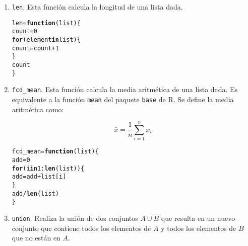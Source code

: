 \documentclass[12pt]{report}\usepackage[]{graphicx}\usepackage[dvipsnames]{xcolor}
\makeatletter
\newcommand{\hlnum}[1]{\textcolor[rgb]{0.686,0.059,0.569}{#1}}%
\newcommand{\hlopt}[1]{\textcolor[rgb]{0,0,0}{#1}}%
\newcommand{\hlstd}[1]{\textcolor[rgb]{0.345,0.345,0.345}{#1}}%
\newcommand{\hlkwa}[1]{\textcolor[rgb]{0.161,0.373,0.58}{\textbf{#1}}}%
\newcommand{\hlkwb}[1]{\textcolor[rgb]{0.69,0.353,0.396}{#1}}%
\newcommand{\hlkwc}[1]{\textcolor[rgb]{0.333,0.667,0.333}{#1}}%
\newcommand{\hlkwd}[1]{\textcolor[rgb]{0.737,0.353,0.396}{\textbf{#1}}}%
\newenvironment{kframe}{%
 \def\at@end@of@kframe{}%
 \ifinner\ifhmode%
  \def\at@end@of@kframe{\end{minipage}}%
  \begin{minipage}{\columnwidth}%
 \fi\fi%
 \def\FrameCommand##1{\hskip\@totalleftmargin \hskip-\fboxsep
 \colorbox{shadecolor}{##1}\hskip-\fboxsep
     \hskip-\linewidth \hskip-\@totalleftmargin \hskip\columnwidth}%
 \MakeFramed {\advance\hsize-\width
   \@totalleftmargin\z@ \linewidth\hsize
   \@setminipage}}%
 {\par\unskip\endMakeFramed%
 \at@end@of@kframe}
\newenvironment{knitrout}{}{} %
\makeatother
\begin{document}
		 	\begin{enumerate}[label = \textbf{\arabic*.}]
		 		\item \texttt{len}. Esta función calcula la longitud de una lista dada.
			 		
\begin{knitrout}
\color{fgcolor}\begin{kframe}
\begin{alltt}
\hlstd{len} \hlkwb{=} \hlkwa{function}\hlstd{(}\hlkwc{list}\hlstd{) \{}
        \hlstd{count} \hlkwb{=} \hlnum{0}
        \hlkwa{for} \hlstd{(element} \hlkwa{in} \hlstd{list) \{}
                \hlstd{count} \hlkwb{=} \hlstd{count} \hlopt{+} \hlnum{1}
        \hlstd{\}}
        \hlstd{count}
\hlstd{\}}
\end{alltt}
\end{kframe}
\end{knitrout}
		 		
		 		\item \texttt{fcd\_mean}. Esta función calcula la media aritmética de una lista dada. Es equivalente a la función \texttt{mean} del paquete \texttt{base} de R. Se define la media aritmética como:
		 		
		 		$$
		 		\bar{x} = \frac{1}{n}\sum_{i=1}^n x_i
		 		$$
		 		
\begin{knitrout}
\color{fgcolor}\begin{kframe}
\begin{alltt}
\hlstd{fcd_mean} \hlkwb{=} \hlkwa{function}\hlstd{(}\hlkwc{list}\hlstd{) \{}
        \hlstd{add} \hlkwb{=} \hlnum{0}
        \hlkwa{for} \hlstd{(i} \hlkwa{in} \hlnum{1}\hlopt{:}\hlkwd{len}\hlstd{(list)) \{}
                \hlstd{add} \hlkwb{=} \hlstd{add} \hlopt{+} \hlstd{list[i]}
        \hlstd{\}}
        \hlstd{add} \hlopt{/} \hlkwd{len}\hlstd{(list)}
\hlstd{\}}
\end{alltt}
\end{kframe}
\end{knitrout}
		 		
		 		\item \texttt{union}. Realiza la unión de dos conjuntos $A \cup B$ que resulta en un nuevo conjunto que contiene todos los elementos de $A$ y todos los elementos de $B$ que no están en $A$.
		 		

\end{enumerate}
\end{document}
